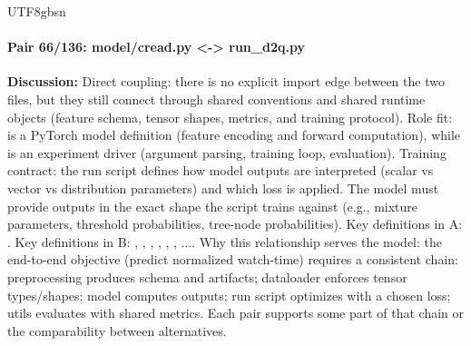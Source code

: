 \documentclass[11pt]{article}
\begin{document}
\begin{CJK*}{UTF8}{gbsn}
\paragraph{Pair 66/136: model/cread.py <-> run\_d2q.py}
\textbf{Discussion:} Direct coupling: there is no explicit import edge between the two files, but they still connect through shared conventions and shared runtime objects (feature schema, tensor shapes, metrics, and training protocol). Role fit: \texttt{} is a PyTorch model definition (feature encoding and forward computation), while \texttt{} is an experiment driver (argument parsing, training loop, evaluation). Training contract: the run script defines how model outputs are interpreted (scalar vs vector vs distribution parameters) and which loss is applied. The model must provide outputs in the exact shape the script trains against (e.g., mixture parameters, threshold probabilities, tree-node probabilities). Key definitions in A: \texttt{}. Key definitions in B: \texttt{}, \texttt{}, \texttt{}, \texttt{}, \texttt{}, \texttt{}, .... Why this relationship serves the model: the end-to-end objective (predict normalized watch-time) requires a consistent chain: preprocessing produces schema and artifacts; dataloader enforces tensor types/shapes; model computes outputs; run script optimizes with a chosen loss; utils evaluates with shared metrics. Each pair supports some part of that chain or the comparability between alternatives.


\end{CJK*}
\end{document}
